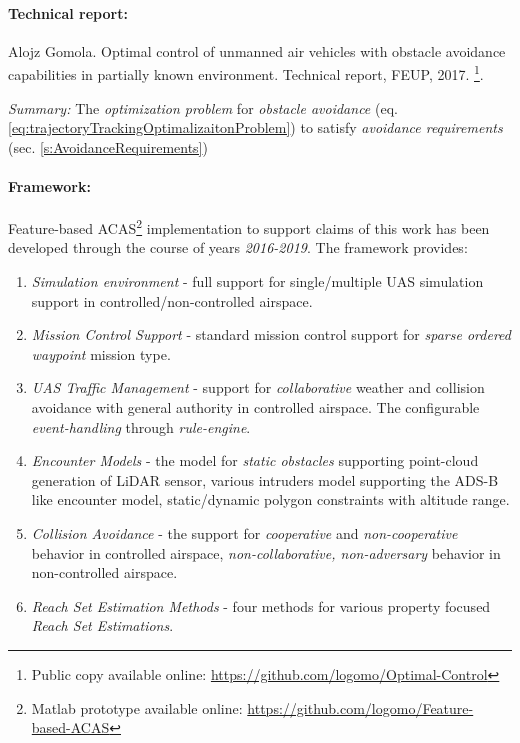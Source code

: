 \paragraph{Technical report:} Alojz  Gomola.   Optimal  control  of  unmanned  air  vehicles  with  obstacle  avoidance capabilities in partially known environment.  Technical report, FEUP, 2017. \cite{gomola2017optimal}\footnote{Public copy available online: \url{https://github.com/logomo/Optimal-Control}}.

\emph{Summary:} The \emph{optimization problem} for \emph{obstacle avoidance} (eq. \ref{eq:trajectoryTrackingOptimalizaitonProblem}) to satisfy \emph{avoidance requirements} (sec. \ref{s:AvoidanceRequirements}) 

\paragraph{Framework:} Feature-based ACAS\footnote{Matlab prototype available online: \url{https://github.com/logomo/Feature-based-ACAS}} implementation to support claims of this work has been developed through the course of years \emph{2016-2019}. The framework provides: 
\begin{enumerate}
    \item \emph{Simulation environment} - full support for single/multiple UAS simulation support in controlled/non-controlled airspace.
    
    \item \emph{Mission Control Support} - standard mission control support for \emph{sparse ordered waypoint} mission type. 
    
    \item \emph{UAS Traffic Management} - support for \emph{collaborative} weather and collision avoidance with general authority in controlled airspace. The configurable \emph{event-handling} through \emph{rule-engine}.
    
    \item \emph{Encounter Models} - the model for \emph{static obstacles} supporting point-cloud generation of LiDAR sensor, various intruders model supporting the ADS-B like encounter model, static/dynamic polygon constraints with altitude range. 
    
    \item \emph{Collision Avoidance} - the support for \emph{cooperative} and \emph{non-cooperative} behavior in controlled airspace, \emph{non-collaborative, non-adversary} behavior in non-controlled airspace. 
    
    \item \emph{Reach Set Estimation Methods} - four methods for various property focused \emph{Reach Set Estimations}.
\end{enumerate}